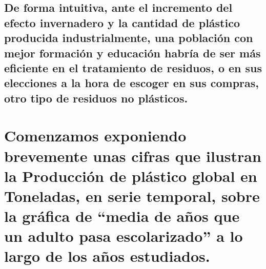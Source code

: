 \documentclass[11pt]{article}
\begin{document}
\hypertarget{de-forma-intuitiva-ante-el-incremento-del-efecto-invernadero-y-la-cantidad-de-pluxe1stico-producida-industrialmente-una-poblaciuxf3n-con-mejor-formaciuxf3n-y-educaciuxf3n-habruxeda-de-ser-muxe1s-eficiente-en-el-tratamiento-de-residuos-o-en-sus-elecciones-a-la-hora-de-escoger-en-sus-compras-otro-tipo-de-residuos-no-pluxe1sticos.}{%
\subsection{De forma intuitiva, ante el incremento del efecto
invernadero y la cantidad de plástico producida industrialmente, una
población con mejor formación y educación habría de ser más eficiente en
el tratamiento de residuos, o en sus elecciones a la hora de escoger en
sus compras, otro tipo de residuos no
plásticos.}\label{de-forma-intuitiva-ante-el-incremento-del-efecto-invernadero-y-la-cantidad-de-pluxe1stico-producida-industrialmente-una-poblaciuxf3n-con-mejor-formaciuxf3n-y-educaciuxf3n-habruxeda-de-ser-muxe1s-eficiente-en-el-tratamiento-de-residuos-o-en-sus-elecciones-a-la-hora-de-escoger-en-sus-compras-otro-tipo-de-residuos-no-pluxe1sticos.}}

\hypertarget{comenzamos-exponiendo-brevemente-unas-cifras-que-ilustran-la-producciuxf3n-de-pluxe1stico-global-en-toneladas-en-serie-temporal-sobre-la-gruxe1fica-de-media-de-auxf1os-que-un-adulto-pasa-escolarizado-a-lo-largo-de-los-auxf1os-estudiados.}{%
\section{Comenzamos exponiendo brevemente unas cifras que ilustran la
Producción de plástico global en Toneladas, en serie temporal, sobre la
gráfica de ``media de años que un adulto pasa escolarizado'' a lo largo
de los años
estudiados.}\label{comenzamos-exponiendo-brevemente-unas-cifras-que-ilustran-la-producciuxf3n-de-pluxe1stico-global-en-toneladas-en-serie-temporal-sobre-la-gruxe1fica-de-media-de-auxf1os-que-un-adulto-pasa-escolarizado-a-lo-largo-de-los-auxf1os-estudiados.}}
\end{document}

